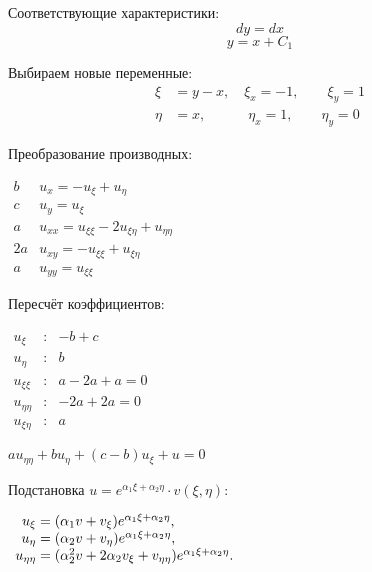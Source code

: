 \documentclass[a4paper,12pt]{article}
\begin{document}
Соответствующие характеристики:
\begin{equation*}
    dy = dx
\end{equation*}
\begin{equation*}
    y = x + C_1
\end{equation*}

Выбираем новые переменные:
\begin{align*}
    \xi &= y - x,   \quad \xi_x = -1, \quad \quad \xi_y = 1 \\
    \eta &= x, \quad \quad \quad \eta_x = 1, \quad \quad \eta_y = 0
\end{align*}

Преобразование производных:
\begin{flushleft}
\(
\begin{array}{r|l}
b & u_x = - u_{\xi} + u_{\eta} \\
c & u_y = u_{\xi} \\
a & u_{xx} = u_{\xi\xi} - 2 u_{\xi\eta} + u_{\eta\eta} \\
2a & u_{xy} = - u_{\xi\xi} + u_{\xi\eta} \\
a & u_{yy} = u_{\xi\xi}
\end{array}
\)
\end{flushleft}

Пересчёт коэффициентов:
\begin{flushleft}
\(
\begin{array}{rcl}
    u_{\xi} &:& -b + c \\
    u_{\eta} &:& b \\
    u_{\xi\xi} &:& a - 2a + a = 0 \\
    u_{\eta\eta} &:& -2a + 2a = 0 \\
    u_{\xi\eta} &:& a
\end{array}
\)
\end{flushleft}

$ au_{\eta\eta} + bu_{\eta} + (c-b)u_{\xi}+u=0$

\vspace{2mm}
Подстановка $ u = e^{\alpha_1 \xi + \alpha_2 \eta} \cdot v(\xi, \eta) $:
\begin{flushleft}
\(
\begin{array}{r@{}l}
    u_{\xi} &{}= (\alpha_1 v + v_{\xi}) e^{\alpha_1 \xi + \alpha_2 \eta}, \\
    u_{\eta} &{}= (\alpha_2 v + v_{\eta}) e^{\alpha_1 \xi + \alpha_2 \eta}, \\
    u_{\eta\eta} &{}= (\alpha_2^2 v + 2\alpha_2 v_{\xi} + v_{\eta\eta}) e^{\alpha_1 \xi + \alpha_2 \eta}.
\end{array}
\)
\end{flushleft}
\end{document}
